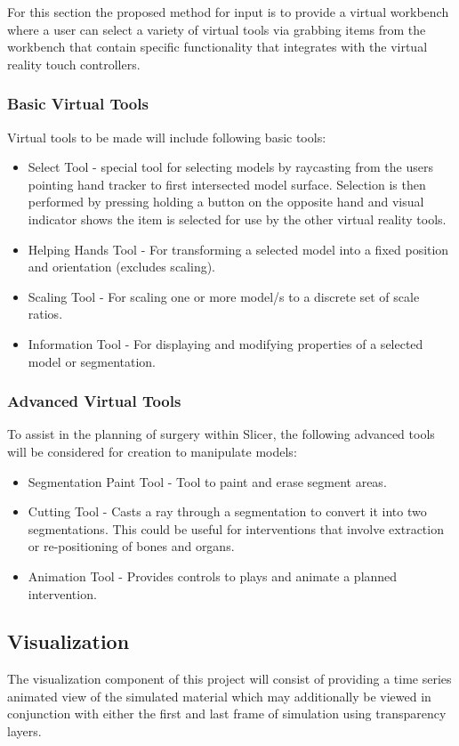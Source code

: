 For this section the proposed method for input is to provide a virtual workbench where a user can select a variety of virtual tools via grabbing items from the workbench that contain specific functionality that integrates with the virtual reality touch controllers.

\subsubsection{Basic Virtual Tools}
Virtual tools to be made will include following basic tools:
\begin{itemize}
\item Select Tool - special tool for selecting models by raycasting from the users pointing hand tracker to first intersected model surface. Selection is then performed by pressing holding a button on the opposite hand and visual indicator shows the item is selected for use by the other virtual reality tools.
\item Helping Hands Tool - For transforming a selected model into a fixed position and orientation (excludes scaling).
\item Scaling Tool - For scaling one or more model/s to a discrete set of scale ratios.
\item Information Tool - For displaying and modifying properties of a selected model or segmentation.
\end{itemize}

\subsubsection{Advanced Virtual Tools}
To assist in the planning of surgery within Slicer, the following advanced tools will be considered for creation to manipulate models:
\begin{itemize}
\item Segmentation Paint Tool - Tool to paint and erase segment areas. 
\item Cutting Tool - Casts a ray through a segmentation to convert it into two segmentations. This could be useful for interventions that involve extraction or re-positioning of bones and organs. 
\item Animation Tool - Provides controls to plays and animate a planned intervention.
\end{itemize}

\subsection{Visualization}
The visualization component of this project will consist of providing a time series animated view of the simulated material which may additionally be viewed in conjunction with either the first and last frame of simulation using transparency layers.

